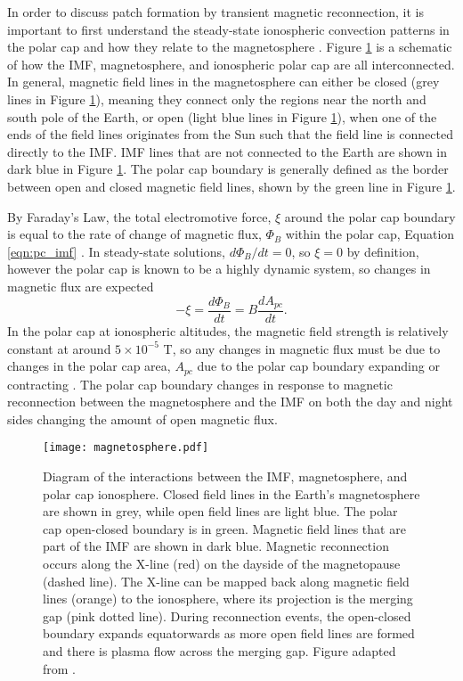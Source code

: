 In order to discuss patch formation by transient magnetic reconnection, it is important to first understand the steady-state ionospheric convection patterns in the polar cap and how they relate to the magnetosphere \citep{Cowley1980}.  Figure \ref{fig:magnetosphere} is a schematic of how the IMF, magnetosphere, and ionospheric polar cap are all interconnected.  In general, magnetic field lines in the magnetosphere can either be closed (grey lines in Figure \ref{fig:magnetosphere}), meaning they connect only the regions near the north and south pole of the Earth, or open (light blue lines in Figure \ref{fig:magnetosphere}), when one of the ends of the field lines originates from the Sun such that the field line is connected directly to the IMF.  IMF lines that are not connected to the Earth are shown in dark blue in Figure \ref{fig:magnetosphere}.  The polar cap boundary is generally defined as the border between open and closed magnetic field lines, shown by the green line in Figure \ref{fig:magnetosphere}.

By Faraday's Law, the total electromotive force, \(\xi\) around the polar cap boundary is equal to the rate of change of magnetic flux, \(\Phi_B\) within the polar cap, Equation \ref{eqn:pc_imf} \citep{Lockwood1992a}.  In steady-state solutions, \(d\Phi_B/dt = 0\), so \(\xi=0\) by definition, however the polar cap is known to be a highly dynamic system, so changes in magnetic flux are expected
\begin{equation}
	\label{eqn:pc_imf}
	-\xi = \frac{d\Phi_B}{dt} = B\frac{dA_{pc}}{dt}.
\end{equation}
In the polar cap at ionospheric altitudes, the magnetic field strength is relatively constant at around \(5\times 10^{-5}\) T, so any changes in magnetic flux must be due to changes in the polar cap area, \(A_{pc}\) due to the polar cap boundary expanding or contracting \citep{Lockwood1992a}.  The polar cap boundary changes in response to magnetic reconnection between the magnetosphere and the IMF  on both the day and night sides changing the amount of open magnetic flux.


\begin{figure}
	\centering
	\texttt{[image: magnetosphere.pdf]}
	\caption[Magnetic reconnection footprint in the ionosphere]{Diagram of the interactions between the IMF, magnetosphere, and polar cap ionosphere.  Closed field lines in the Earth's magnetosphere are shown in grey, while open field lines are light blue.  The polar cap open-closed boundary is in green.  Magnetic field lines that are part of the IMF are shown in dark blue.  Magnetic reconnection occurs along the X-line (red) on the dayside of the magnetopause (dashed line).  The X-line can be mapped back along magnetic field lines (orange) to the ionosphere, where its projection is the merging gap (pink dotted line).  During reconnection events, the open-closed boundary expands equatorwards as more open field lines are formed and there is plasma flow across the merging gap. Figure adapted from \citet{Cowley1991}.}
	\label{fig:magnetosphere}
\end{figure}

